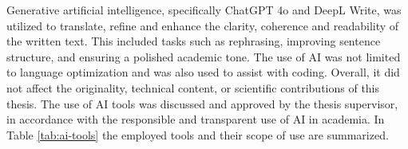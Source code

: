 

Generative artificial intelligence, specifically ChatGPT 4o and DeepL Write, was utilized to translate, refine and enhance the clarity, coherence and readability of the written text. This included tasks such as rephrasing, improving sentence structure, and ensuring a polished academic tone. The use of AI was not limited to language optimization and was also used to assist with coding. Overall, it did not affect the originality, technical content, or scientific contributions of this thesis. The use of AI tools was discussed and approved by the thesis supervisor, in accordance with the responsible and transparent use of AI in academia. In Table \ref{tab:ai-tools} the employed tools and their scope of use are summarized. 


\FloatBarrier

